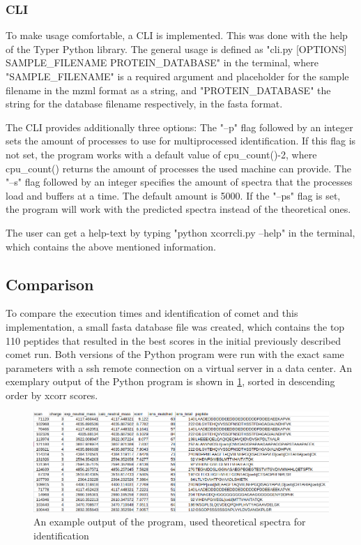 \documentclass[11pt]{article}
\begin{document}
\subsubsection{CLI}
To make usage comfortable, a CLI is implemented. This was done with the help of the Typer Python library. The general usage is defined as "cli.py [OPTIONS] SAMPLE\_FILENAME PROTEIN\_DATABASE" in the terminal, where "SAMPLE\_FILENAME" is a required argument and placeholder for the sample filename in the mzml format as a string, and "PROTEIN\_DATABASE" the string for the database filename respectively, in the fasta format. 

The CLI provides additionally three options: The "--p" flag followed by an integer sets the amount of processes to use for multiprocessed identification. If this flag is not set, the program works with a default value of cpu\_count()-2, where cpu\_count() returns the amount of processes the used machine can provide. The "--s" flag followed by an integer specifies the amount of spectra that the processes load and buffers at a time. The default amount is 5000. If the "--ps" flag is set, the program will work with the predicted spectra instead of the theoretical ones.

The user can get a help-text by typing "python xcorrcli.py --help" in the terminal, which contains the above mentioned information.

\subsection{Comparison}
To compare the execution times and identification of comet and this implementation, a small fasta database file was created, which contains the top 110 peptides that resulted in the best scores in the initial previously described comet run. Both versions of the Python program were run with the exact same parameters with a ssh remote connection on a virtual server in a data center.
An exemplary output of the Python program is shown in \cref{fig:output}, sorted in descending order by xcorr scores.
\begin{figure}[ht]
\centering
\includegraphics[width=1\textwidth]{figs/output.png}
\caption{An example output of the program, used theoretical spectra for identification}
\label{fig:output}
\end{figure}
\end{document}

